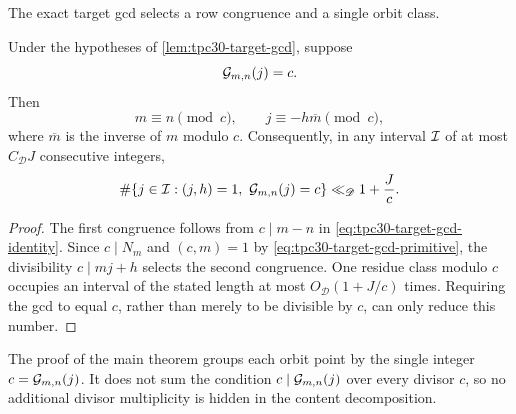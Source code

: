The exact target gcd selects a row congruence and a single orbit
class.

\begin{lemma}
\label{lem:tpc30-content-occupancy}
Under the hypotheses of \cref{lem:tpc30-target-gcd}, suppose
\begin{equation}
 \mathcal G_{m,n}(j)=c.
 \label{eq:tpc30-exact-content-c}
\end{equation}
Then
\begin{equation}
 m\equiv n\pmod c,
 \qquad
 j\equiv-h\overline m\pmod c,
 \label{eq:tpc30-content-congruences}
\end{equation}
where $\overline m$ is the inverse of $m$ modulo $c$.  Consequently,
in any interval $\mathcal I$ of at most $C_{\mathscr D}J$ consecutive
integers,
\begin{equation}
 \#\{j\in\cI:(j,h)=1,\ \cG_{m,n}(j)=c\}
 \ll_{\mathscr D}1+\frac Jc.
 \label{eq:tpc30-exact-content-occupancy}
\end{equation}
\end{lemma}

\begin{proof}
The first congruence follows from $c\mid m-n$ in
\eqref{eq:tpc30-target-gcd-identity}.  Since $c\mid N_m$ and
$(c,m)=1$ by \eqref{eq:tpc30-target-gcd-primitive}, the divisibility
$c\mid mj+h$ selects the second congruence.  One residue class modulo
$c$ occupies an interval of the stated length at most
$O_{\mathscr D}(1+J/c)$ times.  Requiring the gcd to equal $c$, rather
than merely to be divisible by $c$, can only reduce this number.
\end{proof}

\begin{remark}
\label{rem:tpc30-exact-layers}
The proof of the main theorem groups each orbit point by the single
integer $c=\mathcal G_{m,n}(j)$.  It does not sum the condition
$c\mid\mathcal G_{m,n}(j)$ over every divisor $c$, so no additional divisor
multiplicity is hidden in the content decomposition.
\end{remark}
